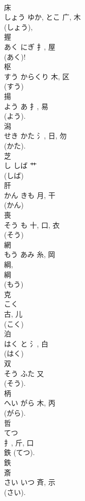 \documentclass[8pt]{extreport}
\begin{document}
\begin{CJK}{UTF8}{min}
\\	床	
\\	しょう	ゆか, とこ	广, 木	
\\	(しょう), 
\\	握	
\\	あく	にぎ	扌, 屋	
\\	(あく)! 
\\	枢	
\\	すう	からくり	木, 区	
\\	(すう) 
\\	揚	
\\	よう	あ	扌, 易	
\\	(よう). 
\\	潟	
\\	せき	かた	氵, 日, 勿	
\\	(かた). 
\\	芝	
\\	し	しば	艹		
\\	(しば) 
\\	肝	
\\	かん	きも	月, 干	
\\	(かん) 
\\	喪	
\\	そう	も	十, 口, 衣	
\\	(そう) 
\\	網	
\\	もう	あみ	糸, 岡	
\\	綱, 
\\	綱 
\\	(もう) 
\\	克	
\\	こく	
\\	古, 儿	
\\	(こく) 
\\	泊	
\\	はく	と	氵, 白	
\\	(はく) 
\\	双	
\\	そう	ふた	又	
\\	(そう). 
\\	柄	
\\	へい	がら	木, 丙	
\\	(がら). 
\\	哲	
\\	てつ	
\\	扌, 斤, 口	
\\	鉄 (てつ). 
\\	鉄 
\\	斎	
\\	さい	いつ	斉, 示	
\\	(さい). 

\end{CJK}
\end{document}
